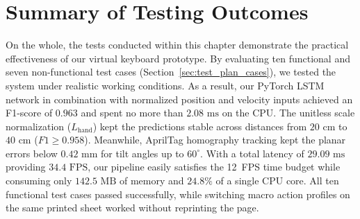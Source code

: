 \section{Summary of Testing Outcomes}
\label{sec:test_summary}
On the whole, the tests conducted within this chapter demonstrate the practical effectiveness of our virtual keyboard prototype. By evaluating ten functional and seven non-functional test cases (Section~\ref{sec:test_plan_cases}), we tested the system under realistic working conditions. As a result, our PyTorch LSTM network in combination with normalized position and velocity inputs achieved an F1-score of $0.963$ and spent no more than $2.08\text{ ms}$ on the CPU. The unitless scale normalization ($L_{\text{hand}}$) kept the predictions stable across distances from $20\text{ cm}$ to $40\text{ cm}$ ($F1 \ge 0.958$). Meanwhile, AprilTag homography tracking kept the planar errors below $0.42\text{ mm}$ for tilt angles up to $60^\circ$. With a total latency of $29.09\text{ ms}$ providing $34.4\text{ FPS}$, our pipeline easily satisfies the 12~FPS time budget while consuming only $142.5\text{ MB}$ of memory and $24.8\%$ of a single CPU core. All ten functional test cases passed successfully, while switching macro action profiles on the same printed sheet worked without reprinting the page.
